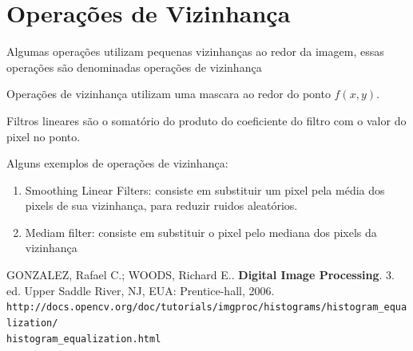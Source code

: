 \documentclass[10pt,a4paper]{article}
\begin{document}
\section{Operações de Vizinhança}
Algumas operações utilizam pequenas vizinhanças ao redor da imagem, essas operações são denominadas operações de vizinhança

Operações de vizinhança utilizam uma mascara ao redor do ponto $f(x,y)$.

Filtros lineares são o somatório do produto do coeficiente do filtro com o valor do pixel no ponto.

Alguns exemplos de operações de vizinhança:

\begin{enumerate}
\item Smoothing Linear Filters: consiste em substituir um pixel pela média dos pixels de sua vizinhança, para reduzir ruidos aleatórios.

\item Mediam filter: consiste em substituir o pixel pelo mediana dos pixels da vizinhança
\end{enumerate}


\begin{thebibliography}{99}
     GONZALEZ, Rafael C.; WOODS, Richard E.. \textbf{Digital Image Processing}. 3. ed. Upper Saddle River, NJ, EUA: Prentice-hall, 2006.
     \texttt{http://docs.opencv.org/doc/tutorials/imgproc/histograms/histogram\_equalization/\\histogram\_equalization.html}
\end{thebibliography}
\end{document}
